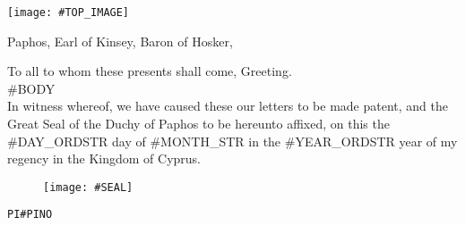 \documentclass[varwidth=true,border=50pt]{standalone}
\begin{document}
\thispagestyle{fancy}

\noindent \texttt{[image: \#TOP\_IMAGE]}

{\LARGE
    Paphos, Earl of Kinsey, Baron of Hosker,

    \hspace{20pt} To all to whom these presents shall come, Greeting.\\

    \hspace{20pt} #BODY\\

    \hspace{20pt} In witness whereof, we have caused these our letters to be made patent, and the Great Seal of the Duchy of Paphos to be hereunto affixed, on this the #DAY_ORDSTR day of #MONTH_STR in the #YEAR_ORDSTR year of my regency in the Kingdom of Cyprus.
}

\begin{figure}[h]
    \centering
    \texttt{[image: \#SEAL]}
\end{figure}

\hfill {\footnotesize \texttt{PI{#PINO}}}
\end{document}
